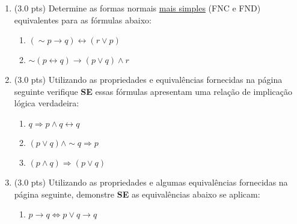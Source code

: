 \documentclass[12pt]{article}
\begin{document}
\begin{enumerate}
\item (3.0 pts) Determine as formas normais \underline{mais simples} (FNC e FND) equivalentes para as fórmulas abaixo: 

\begin{enumerate}
\setlength{\itemsep}{-5pt}

\item $(\sim p\rightarrow q)\leftrightarrow (r \vee p)$
\item $\sim(p\leftrightarrow q)\rightarrow (p\vee q)\wedge r$
\end{enumerate}

%
%
%

\item (3.0 pts) Utilizando as propriedades e equivalências
fornecidas na página seguinte verifique {\bf SE} 
essas fórmulas apresentam uma relaç\~ao de implicaç\~ao lógica  
verdadeira:

\begin{enumerate}
\setlength{\itemsep}{-2pt}

\item $q \Rightarrow p \wedge q \leftrightarrow q$

\item  $ (p \vee q) \wedge \sim q \Rightarrow p $


\item $(p \wedge q) \Rightarrow (p \vee q)$

\end{enumerate}


\item (3.0 pts) Utilizando as propriedades e algumas equivalências
fornecidas na página seguinte, demonstre {\bf SE} as equivalências abaixo 
se aplicam:

\begin{enumerate}
\setlength{\itemsep}{-2pt}

\item $p \rightarrow q \Leftrightarrow p \vee q \rightarrow  q$ %



\end{enumerate}
\end{enumerate}
\end{document}
